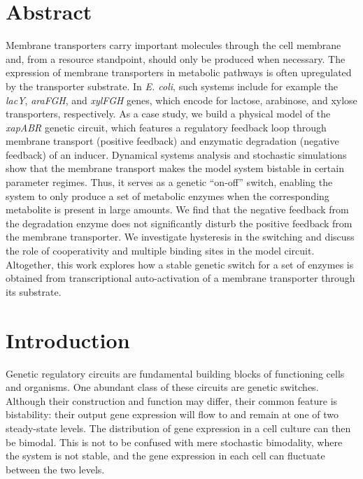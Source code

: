 \documentclass[10pt,letterpaper]{article}
\begin{document}
\section*{Abstract}
Membrane transporters carry important molecules through the cell membrane
and, from a resource standpoint, should only be produced when necessary. The
expression of membrane transporters in metabolic pathways is often
upregulated by the transporter substrate. In \emph{E. coli}, such systems
include for example the \emph{lacY}, \emph{araFGH}, and \emph{xylFGH} genes,
which encode for lactose, arabinose, and xylose transporters, respectively.
As a case study, we build a physical model of the \emph{xapABR} genetic
circuit, which features a regulatory feedback loop through membrane
transport (positive feedback) and enzymatic degradation (negative feedback)
of an inducer. Dynamical systems analysis and stochastic simulations show
that the membrane transport makes the model system bistable in certain
parameter regimes. Thus, it serves as a genetic “on-off” switch, enabling
the system to only produce a set of metabolic enzymes when the corresponding
metabolite is present in large amounts. We find that the negative feedback
from the degradation enzyme does not significantly disturb the positive
feedback from the membrane transporter. We investigate hysteresis in the
switching and discuss the role of cooperativity and multiple binding sites
in the model circuit. Altogether, this work explores how a stable genetic
switch for a set of enzymes is obtained from transcriptional auto-activation
of a membrane transporter through its substrate.

\linenumbers


\section*{Introduction}
Genetic regulatory circuits are fundamental building blocks of functioning
cells and organisms. One abundant class of these circuits are genetic
switches. Although their construction and function may differ,
their common feature is bistability: their output gene expression
will flow to and remain at one of two steady-state levels.
The distribution of
gene expression in a cell culture can then be bimodal. This is not to be
confused with mere stochastic bimodality, where the system is not stable,
and the gene expression in each cell can fluctuate between the two levels.
\end{document}
